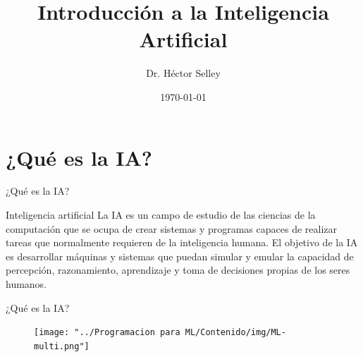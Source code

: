 \documentclass[11pt,aspectratio=169]{beamer}
\date{\today}
\author{Dr. Héctor Selley}
\institute{Universidad Anáhuac México}
\title[Introducción a la IA]{Introducción a la Inteligencia Artificial}
\begin{document}

\begin{frame}
    \titlepage
\end{frame}

\begin{frame}
    \tableofcontents
\end{frame}

\section{¿Qué es la IA?}
\begin{frame}{¿Qué es la IA?}
    \begin{block}{Inteligencia artificial}\pause
        La IA es un campo de estudio de las ciencias de 
        la computación que se ocupa de crear sistemas y programas capaces de 
        realizar tareas que normalmente requieren de la inteligencia humana. \pause
        El objetivo de la IA es desarrollar máquinas y sistemas que puedan 
        simular y emular la capacidad de percepción, razonamiento, aprendizaje 
        y toma de decisiones propias de los seres humanos.
    \end{block}
\end{frame}

\begin{frame}{¿Qué es la IA?}
    \begin{figure}
        \centering
        \texttt{[image: "../Programacion para ML/Contenido/img/ML-multi.png"]}
    \end{figure}
\end{frame}
\end{document}
